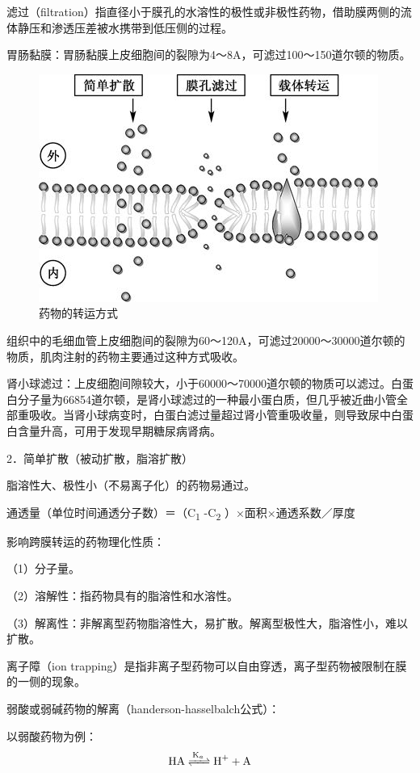 滤过（filtration）指直径小于膜孔的水溶性的极性或非极性药物，借助膜两侧的流体静压和渗透压差被水携带到低压侧的过程。

胃肠黏膜：胃肠黏膜上皮细胞间的裂隙为4～8A，可滤过100～150道尔顿的物质。

\begin{figure}[!htbp]
 \centering
 \includegraphics{./images/Image00025.jpg}
 \captionsetup{justification=centering}
 \caption{药物的转运方式}
 \label{fig3-1}
  \end{figure} 

组织中的毛细血管上皮细胞间的裂隙为60～120A，可滤过20000～30000道尔顿的物质，肌肉注射的药物主要通过这种方式吸收。

肾小球滤过：上皮细胞间隙较大，小于60000～70000道尔顿的物质可以滤过。白蛋白分子量为66854道尔顿，是肾小球滤过的一种最小蛋白质，但几乎被近曲小管全部重吸收。当肾小球病变时，白蛋白滤过量超过肾小管重吸收量，则导致尿中白蛋白含量升高，可用于发现早期糖尿病肾病。

2．简单扩散（被动扩散，脂溶扩散）

脂溶性大、极性小（不易离子化）的药物易通过。

通透量（单位时间通透分子数）＝（C\textsubscript{1} -C\textsubscript{2}
）×面积×通透系数／厚度

影响跨膜转运的药物理化性质：

（1）分子量。

（2）溶解性：指药物具有的脂溶性和水溶性。

（3）解离性：非解离型药物脂溶性大，易扩散。解离型极性大，脂溶性小，难以扩散。

离子障（ion
trapping）是指非离子型药物可以自由穿透，离子型药物被限制在膜的一侧的现象。

弱酸或弱碱药物的解离（handerson-hasselbalch公式）：

以弱酸药物为例：
$$\ce{HA <=>[K_a] H+ + A}$$


